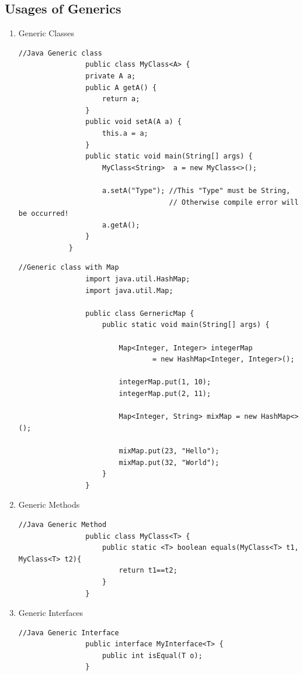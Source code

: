 \documentclass[12pt,a4paper]{report}
\begin{document}
\subsection*{Usages of Generics}
\begin{enumerate}[label=(\roman*)]
\item Generic Classes\\
\begin{lstlisting}
//Java Generic class
	            public class MyClass<A> {
                private A a;
                public A getA() {
                    return a;
                }
                public void setA(A a) {
                    this.a = a;
                }
                public static void main(String[] args) {
                    MyClass<String>  a = new MyClass<>();

                    a.setA("Type"); //This "Type" must be String, 
                                    // Otherwise compile error will be occurred!
                    a.getA();
                }
            }

\end{lstlisting}

\begin{lstlisting}
//Generic class with Map
                import java.util.HashMap;
                import java.util.Map;
                
                public class GernericMap {
                    public static void main(String[] args) {
                
                        Map<Integer, Integer> integerMap
                                = new HashMap<Integer, Integer>();
                
                        integerMap.put(1, 10);
                        integerMap.put(2, 11);
                
                        Map<Integer, String> mixMap = new HashMap<>();
                
                        mixMap.put(23, "Hello");
                        mixMap.put(32, "World");
                    }
                }

\end{lstlisting}

\item Generic Methods\\

\begin{lstlisting}
//Java Generic Method
                public class MyClass<T> {
                    public static <T> boolean equals(MyClass<T> t1, MyClass<T> t2){
                        return t1==t2;
                    }
                }
\end{lstlisting}


\item Generic Interfaces\\

\begin{lstlisting}
//Java Generic Interface
                public interface MyInterface<T> {
                    public int isEqual(T o);
                }
\end{lstlisting}


\end{enumerate}
\end{document}
